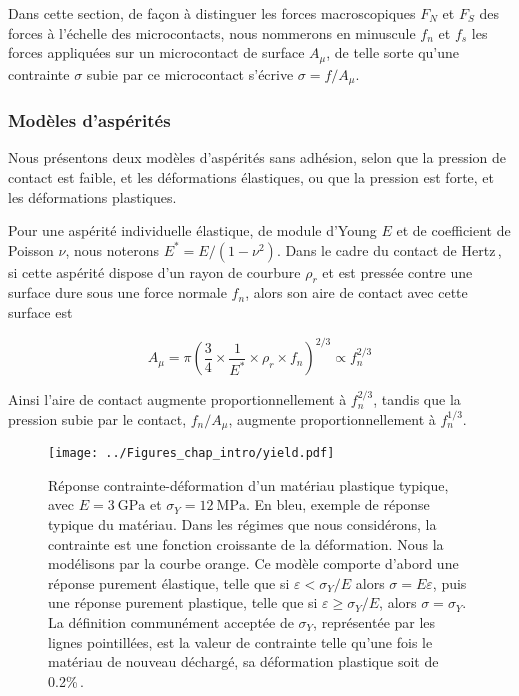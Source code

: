 Dans cette section, de façon à distinguer les forces macroscopiques $F_N$ et $F_S$ des forces à l'échelle des microcontacts, nous nommerons en minuscule $f_n$ et $f_s$ les forces appliquées sur un microcontact de surface $A_\mu$, de telle sorte qu'une contrainte $\sigma$ subie par ce microcontact s'écrive $\sigma=f/A_\mu$.


\subsubsection{Modèles d'aspérités}




Nous présentons deux modèles d'aspérités sans adhésion, selon que la pression de contact est faible, et les déformations élastiques, ou que la pression est forte, et les déformations plastiques.


Pour une aspérité individuelle élastique, de module d'Young $E$ et de coefficient de Poisson $\nu$, nous noterons $E^*={E}/(1-\nu^2)$. Dans le cadre du contact de Hertz\,\cite{hertz_ueber_1882}, si cette aspérité dispose d'un rayon de courbure $\rho_r$ et est pressée contre une surface dure sous une force normale $f_n$, alors son aire de contact avec cette surface est

\begin{equation}
A_\mu = \pi\left(\frac{3}{4}\times\frac{1}{E^*}\times\rho_r\times f_n\right)^{2/3}\propto f_n^{2/3}
\end{equation}



Ainsi l'aire de contact augmente proportionnellement à $f_n^{2/3}$, tandis que la pression subie par le contact, $f_n/A_\mu$, augmente proportionnellement à $f_n^{1/3}$.



\begin{figure}[htb]
\centering
\texttt{[image: ../Figures\_chap\_intro/yield.pdf]}
\caption[Limite de plasticité d'un matériau]{Réponse contrainte-déformation d'un matériau plastique typique, avec $E=\SI{3}{\giga\pascal}$ et $\sigma_Y=\SI{12}{\mega\pascal}$. En bleu, exemple de réponse typique du matériau. Dans les régimes que nous considérons, la contrainte est une fonction croissante de la déformation. Nous la modélisons par la courbe orange. Ce modèle comporte d'abord une réponse purement élastique, telle que si $\varepsilon<\sigma_Y/E$ alors $\sigma=E\varepsilon$, puis une réponse purement plastique, telle que si $\varepsilon\geq\sigma_Y/E$, alors $\sigma = \sigma_Y$. La définition communément acceptée de $\sigma_Y$, représentée par les lignes pointillées, est la valeur de contrainte telle qu'une fois le matériau de nouveau déchargé, sa déformation plastique soit de 0.2\%\,\cite{avallone_marks_2006}.}
\label{fig:yield}
\end{figure}




